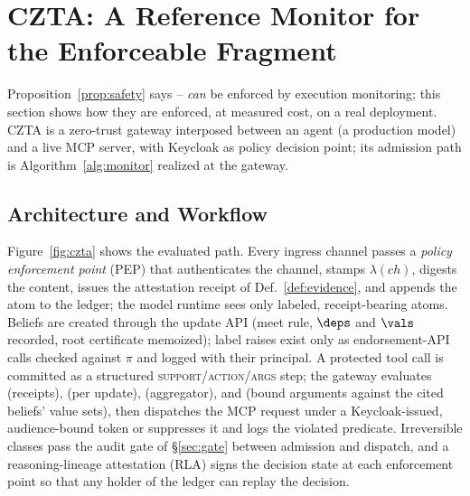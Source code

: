 \section{CZTA: A Reference Monitor for the Enforceable Fragment}
\label{sec:czta}
Proposition~\ref{prop:safety} says \Ione--\Ifour{} \emph{can} be
enforced by execution monitoring; this section shows how they are
enforced, at measured cost, on a real deployment. CZTA is a zero-trust
gateway interposed between an agent (a production model) and a live
MCP server, with Keycloak as policy decision point; its admission path
is Algorithm~\ref{alg:monitor} realized at the gateway.

\subsection{Architecture and Workflow}
\label{sec:arch}
Figure~\ref{fig:czta} shows the evaluated path. Every ingress channel
passes a \emph{policy enforcement point} (PEP) that authenticates the
channel, stamps $\lambda(\mathit{ch})$, digests the content, issues the
attestation receipt of Def.~\ref{def:evidence}, and appends the atom to
the ledger; the model runtime sees only labeled, receipt-bearing atoms.
Beliefs are created through the update API (meet rule, $\deps$ and
$\vals$ recorded, root certificate memoized); label raises exist only
as endorsement-API calls checked against $\pi$ and logged with their
principal. A protected tool call is committed as a structured
\textsc{support}/\textsc{action}/\textsc{args} step; the gateway
evaluates \Ione{} (receipts), \Itwo{} (per update), \Ithree{}
(aggregator), and \Ifour{} (bound arguments against the cited beliefs'
value sets), then dispatches the MCP request under a Keycloak-issued,
audience-bound token or suppresses it and logs the violated predicate.
Irreversible classes pass the audit gate of \S\ref{sec:gate} between
admission and dispatch, and a reasoning-lineage attestation (RLA) signs
the decision state at each enforcement point so that any holder of the
ledger can replay the decision.

